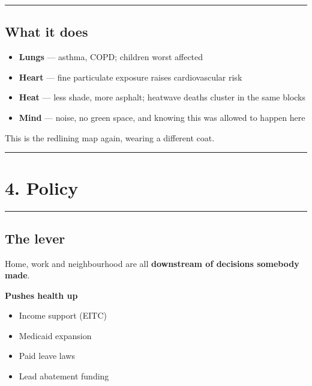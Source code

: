 \documentclass[
  letterpaper,
  DIV=11,
  numbers=noendperiod]{scrartcl}
\providecommand{\tightlist}{%
  \setlength{\itemsep}{0pt}\setlength{\parskip}{0pt}}
\begin{document}
\begin{center}\rule{0.5\linewidth}{0.5pt}\end{center}

\subsection{\texorpdfstring{{\textbf{What it
does}}}{What it does}}\label{what-it-does}

\begin{itemize}
\tightlist
\item
  \textbf{Lungs} --- asthma, COPD; children worst affected
\item
  \textbf{Heart} --- fine particulate exposure raises cardiovascular
  risk
\item
  \textbf{Heat} --- less shade, more asphalt; heatwave deaths cluster in
  the same blocks
\item
  \textbf{Mind} --- noise, no green space, and knowing this was allowed
  to happen here
\end{itemize}

This is the redlining map again, wearing a different coat.

\begin{center}\rule{0.5\linewidth}{0.5pt}\end{center}

\section{\texorpdfstring{{\textbf{4.
Policy}}}{4. Policy}}\label{policy-1}

\begin{center}\rule{0.5\linewidth}{0.5pt}\end{center}

\subsection{\texorpdfstring{{\textbf{The
lever}}}{The lever}}\label{the-lever}

Home, work and neighbourhood are all \textbf{downstream of decisions
somebody made}.

\textbf{Pushes health up}

\begin{itemize}
\tightlist
\item
  Income support (EITC)
\item
  Medicaid expansion
\item
  Paid leave laws
\item
  Lead abatement funding
\end{itemize}
\end{document}
